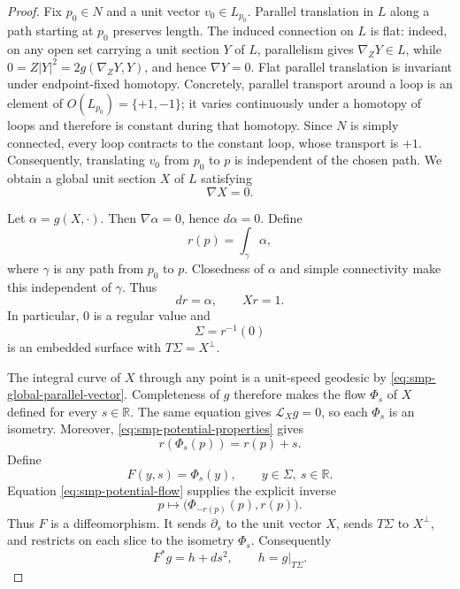 \documentclass[10pt]{coll-l}
\newcommand{\R}{\mathbb{R}}
\theoremstyle{definition}
\theoremstyle{remark}
\numberwithin{section}{chapter}
\numberwithin{equation}{chapter}
\begin{document}
\begin{proof}
Fix $p_0\in N$ and a unit vector $v_0\in L_{p_0}$.  Parallel translation in
$L$ along a path starting at $p_0$ preserves length.  The induced connection
on $L$ is flat: indeed, on any open set carrying a unit section $Y$ of $L$,
parallelism gives $\nabla_ZY\in L$, while
$0=Z|Y|^2=2g(\nabla_ZY,Y)$, and hence $\nabla Y=0$.  Flat parallel
translation is invariant under endpoint-fixed homotopy.  Concretely,
parallel transport around a loop is an element of
$O(L_{p_0})=\{+1,-1\}$; it varies continuously under a homotopy of loops and
therefore is constant during that homotopy.  Since $N$ is simply connected,
every loop contracts to the constant loop, whose transport is $+1$.
Consequently, translating $v_0$ from $p_0$ to $p$ is independent of the
chosen path.  We obtain a global unit section $X$ of $L$ satisfying
\begin{equation}
                              \nabla X=0.                 \label{eq:smp-global-parallel-vector}
\end{equation}

Let $\alpha=g(X,\cdot)$.  Then $\nabla\alpha=0$, hence $d\alpha=0$.  Define
\begin{equation}
       r(p)=\int_\gamma\alpha,                            \label{eq:smp-global-potential}
\end{equation}
where $\gamma$ is any path from $p_0$ to $p$.  Closedness of $\alpha$ and
simple connectivity make this independent of $\gamma$.  Thus
\begin{equation}
                         dr=\alpha,
             \qquad     Xr=1.                            \label{eq:smp-potential-properties}
\end{equation}
In particular, $0$ is a regular value and
\[
                         \Sigma=r^{-1}(0)
\]
is an embedded surface with $T\Sigma=X^\perp$.

The integral curve of $X$ through any point is a unit-speed geodesic by
\eqref{eq:smp-global-parallel-vector}.  Completeness of $g$ therefore makes
the flow $\Phi_s$ of $X$ defined for every $s\in\R$.  The same equation gives
$\mathcal L_Xg=0$, so each $\Phi_s$ is an isometry.  Moreover,
\eqref{eq:smp-potential-properties} gives
\begin{equation}
                       r(\Phi_s(p))=r(p)+s.               \label{eq:smp-potential-flow}
\end{equation}
Define
\[
             F(y,s)=\Phi_s(y),
             \qquad y\in\Sigma,\ s\in\R.
\]
Equation \eqref{eq:smp-potential-flow} supplies the explicit inverse
\begin{equation}
       p\longmapsto\bigl(\Phi_{-r(p)}(p),r(p)\bigr).       \label{eq:smp-global-product-inverse}
\end{equation}
Thus $F$ is a diffeomorphism.  It sends $\partial_s$ to the unit vector
$X$, sends $T\Sigma$ to $X^\perp$, and restricts on each slice to the
isometry $\Phi_s$.  Consequently
\[
                             F^*g=h+ds^2,
             \qquad h=g|_{T\Sigma}.
\]


\end{proof}
\end{document}
